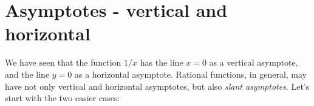 \documentclass{ximera}
\begin{document}




\section{Asymptotes - vertical and horizontal}

We have seen that the function $1/x$ has the line $x=0$ as a vertical asymptote, and the line $y=0$ as a horizontal asymptote. Rational functions, in general, may have not only vertical and horizontal asymptotes, but also \emph{slant asymptotes}. Let's start with the two easier cases:
\end{document}
